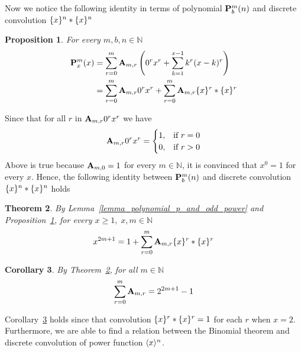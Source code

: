 \documentclass[12pt,letterpaper,oneside,reqno]{amsart}
\newcommand \anglePower [2]{\langle #1 \rangle \sp{#2}}
\newcommand \curvePower [2]{\{#1\}\sp{#2}}
\newcommand \coeffA [3][A] {{\mathbf{#1}} \sb{#2,#3}}
\newcommand \polynomialP [4][P]{{\mathbf{#1}}\sp{#2} \sb{#3}(#4)}
\newtheorem{thm}{Theorem}[section]
\newtheorem{cor}[thm]{Corollary}
\newtheorem{prop}[thm]{Proposition}
\numberwithin{equation}{section}
\begin{document}
    Now we notice the following identity in terms of polynomial $\polynomialP{m}{b}{n}$ and
    discrete convolution $\curvePower{x}{n} \ast \curvePower{x}{n}$
    \begin{prop}
        \label{prop_polynomial_p_and_macaulay_convolution_strict}
        For every $m,b,n \in \mathbb{N}$
        \begin{equation*}
            \begin{split}
                \polynomialP{m}{x}{x}
                &=\sum_{r=0}^{m} \coeffA{m}{r} \left(0^r x^r + \sum_{k=1}^{x-1} k^r (x-k)^r \right) \\
                &=\sum_{r=0}^{m} \coeffA{m}{r} 0^r x^r + \sum_{r=0}^{m} \coeffA{m}{r}
                \curvePower{x}{r} \ast \curvePower{x}{r}
            \end{split}
        \end{equation*}
    \end{prop}
    Since that for all $r$ in $\coeffA{m}{r} 0^r x^r$ we have
    \begin{equation*}
        \coeffA{m}{r} 0^r x^r =
        \begin{cases}
            1, & \mbox{if } r=0 \\
            0, & \mbox{if } r>0
        \end{cases}
    \end{equation*}
    Above is true because $\coeffA{m}{0}=1$ for every $m\in\mathbb{N}$, it is convinced \cite{Grah94SN} that $x^0 = 1$
    for every $x$.
    Hence, the following identity between $\polynomialP{m}{b}{n}$ and
    discrete convolution $\curvePower{x}{n} \ast \curvePower{x}{n}$ holds
    \begin{thm}
        \label{thm_odd_power_by_macaulays_convolution_strict}
        By Lemma~\ref{lemma_polynomial_p_and_odd_power} and
        Proposition~\ref{prop_polynomial_p_and_macaulay_convolution_strict},
        for every $x\geq 1, \; x,m\in\mathbb{N}$
        \begin{equation*}
            x^{2m+1} = 1 + \sum_{r=0}^{m} \coeffA{m}{r} \curvePower{x}{r} \ast \curvePower{x}{r}
        \end{equation*}
    \end{thm}
    \begin{cor}
        \label{cor_sum_of_coeffs_a}
        By Theorem~\ref{thm_odd_power_by_macaulays_convolution_strict}, for all $m\in\mathbb{N}$
        \begin{equation*}
            \sum_{r=0}^{m} \coeffA{m}{r} = 2^{2m+1} - 1
        \end{equation*}
    \end{cor}
    Corollary~\ref{cor_sum_of_coeffs_a} holds since that convolution $\curvePower{x}{r} \ast \curvePower{x}{r}=1$
    for each $r$ when $x=2$.
    Furthermore, we are able to find a relation between the Binomial theorem and discrete convolution of
    power function $\anglePower{x}{n}$.
\end{document}

